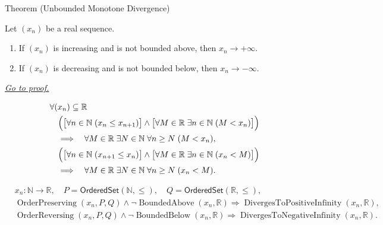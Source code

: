 
\begin{theorembox}{Theorem (Unbounded Monotone Divergence)}
\begin{theorem}
\label{thm:unbounded-monotone-divergence}
Let $(x_n)$ be a real sequence.
\begin{enumerate}[label=(\alph*)]
  \item If $(x_n)$ is increasing and is not bounded above, then
  $x_n\to+\infty$.
  \item If $(x_n)$ is decreasing and is not bounded below, then
  $x_n\to-\infty$.
\end{enumerate}

\smallskip
\noindent
\hyperref[prf:unbounded-monotone-divergence]{\textit{Go to proof.}}
\end{theorem}
\end{theorembox}

\begin{remark*}
\[
\begin{aligned}
&\forall (x_n)\subseteq\mathbb{R}\\
&\quad
\Bigl(
  \bigl[\forall n\in\mathbb{N}\;(x_n\le x_{n+1})\bigr]
  \land
  \bigl[\forall M\in\mathbb{R}\;\exists n\in\mathbb{N}\;(M<x_n)\bigr]
\Bigr)\\
&\quad\Longrightarrow\quad
\forall M\in\mathbb{R}\;\exists N\in\mathbb{N}\;\forall n\ge N\;(M<x_n),\\
&\quad
\Bigl(
  \bigl[\forall n\in\mathbb{N}\;(x_{n+1}\le x_n)\bigr]
  \land
  \bigl[\forall M\in\mathbb{R}\;\exists n\in\mathbb{N}\;(x_n<M)\bigr]
\Bigr)\\
&\quad\Longrightarrow\quad
\forall M\in\mathbb{R}\;\exists N\in\mathbb{N}\;\forall n\ge N\;(x_n<M).
\end{aligned}
\]
\end{remark*}

\begin{remark*}
\[
\begin{aligned}
&x_n\colon\mathbb{N}\to\mathbb{R},\quad
P=\mathsf{OrderedSet}(\mathbb{N},\leq),\quad
Q=\mathsf{OrderedSet}(\mathbb{R},\leq),\\
&\operatorname{OrderPreserving}(x_n,P,Q)
\land
\neg\operatorname{BoundedAbove}(x_n,\mathbb{R})
\Longrightarrow
\operatorname{DivergesToPositiveInfinity}(x_n,\mathbb{R}),\\
&\operatorname{OrderReversing}(x_n,P,Q)
\land
\neg\operatorname{BoundedBelow}(x_n,\mathbb{R})
\Longrightarrow
\operatorname{DivergesToNegativeInfinity}(x_n,\mathbb{R}).
\end{aligned}
\]
\end{remark*}

